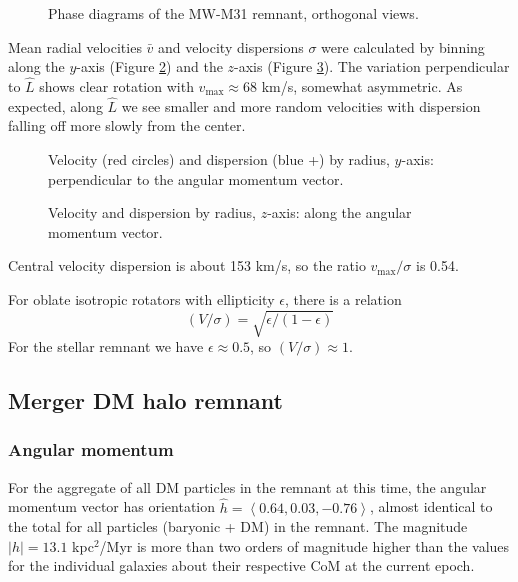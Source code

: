 \documentclass[twocolumn]{aastex63}
\newcommand{\todo}{\color{red}{TODO}\color{black}\hspace{2mm}}
\begin{document}
\begin{figure}[htb!]
	\caption{Phase diagrams of the MW-M31 remnant, orthogonal views.
	\label{fig:rem_phase}}
\end{figure}

Mean radial velocities $\bar{v}$ and velocity dispersions $\sigma$ were calculated by binning along the $y$-axis (Figure \ref{fig:rem_disp_y}) and the $z$-axis (Figure \ref{fig:rem_disp_z}). The variation perpendicular to $\hat{L}$ shows clear rotation with $v_{\text{max}} \approx 68$ km/s, somewhat asymmetric. As expected, along $\hat{L}$ we see smaller and more random velocities with dispersion falling off more slowly from the center.

\begin{figure}[htb!]
	\caption{Velocity (red circles) and dispersion (blue +) by radius, $y$-axis: perpendicular to the angular momentum vector.
		\label{fig:rem_disp_y}}
\end{figure}

\begin{figure}[htb!]
	\caption{Velocity and dispersion by radius, $z$-axis: along the angular momentum vector.
		\label{fig:rem_disp_z}}
\end{figure}

Central velocity dispersion is about 153 km/s, so the ratio $v_{\text{max}} / \sigma$ is 0.54.

For oblate isotropic rotators with ellipticity $\epsilon$, there is a relation \todo{Binney78 ref}
\[ (V/\sigma) = \sqrt{\epsilon / (1 - \epsilon)} \]
For the stellar remnant we have $\epsilon \approx 0.5$, so $(V/\sigma) \approx 1$.

\todo{Finish discussion - this is NOT oblate}

\subsection{Merger DM halo remnant}

\subsubsection{Angular momentum}

For the aggregate of all DM particles in the remnant at this time, the angular momentum vector has orientation $\hat{h} = \left< 0.64 ,  0.03, -0.76 \right>$, almost identical to the total for all particles (baryonic + DM) in the remnant. The magnitude $|h| = 13.1$ kpc$^2$/Myr is more than two orders of magnitude higher than the values for the individual galaxies about their respective CoM at the current epoch. 
\end{document}

